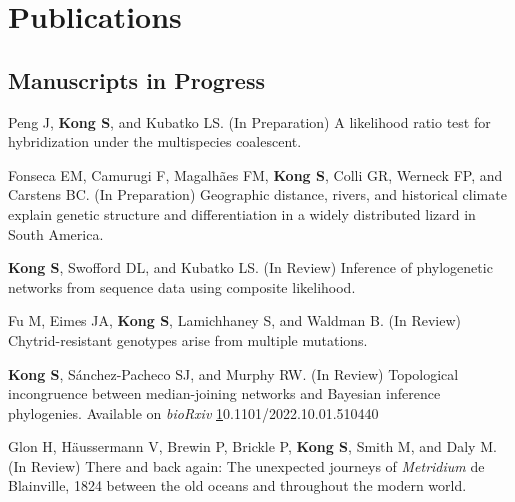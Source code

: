 \documentclass[11pt]{article}
\begin{document}
\hspace{0pt}


\section*{Publications}
\subsection*{Manuscripts in Progress}
\begin{etaremune}



	\item Peng J, \textbf{Kong S}, and Kubatko LS. (In Preparation) A likelihood ratio test for hybridization under the multispecies coalescent. %
		
	\item Fonseca EM, Camurugi F, Magalhães FM, \textbf{Kong S}, Colli GR, Werneck FP, and Carstens BC. (In Preparation) Geographic distance, rivers, and historical climate explain genetic structure and differentiation in a widely distributed lizard in South America. %
		
	\item \textbf{Kong S}, Swofford DL, and Kubatko LS. (In Review) Inference of phylogenetic networks from sequence data using composite likelihood. %
		
	\item Fu M, Eimes JA, \textbf{Kong S}, Lamichhaney S, and Waldman B. (In Review) Chytrid-resistant genotypes arise from multiple mutations. %

	\item \textbf{Kong S}, Sánchez-Pacheco SJ, and Murphy RW. (In Review) Topological incongruence between median-joining networks and Bayesian inference phylogenies. Available on \textit{bioRxiv} \href{https://doi.org/10.1101/2022.10.01.510440}10.1101/2022.10.01.510440 %

	\item Glon H, Häussermann V, Brewin P, Brickle P, \textbf{Kong S}, Smith M, and Daly M. (In Review) There and back again: The unexpected journeys of \textit{Metridium} de Blainville, 1824 between the old oceans and throughout the modern world. %

\end{etaremune}
\end{document}
